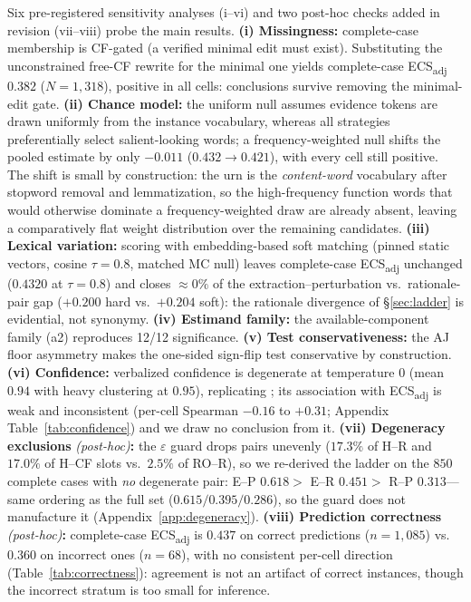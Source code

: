 \documentclass[11pt]{article}
\newcommand{\ecsadj}{\mbox{ECS\textsubscript{adj}}}
\begin{document}
Six pre-registered sensitivity analyses (i--vi) and two post-hoc checks added in revision (vii--viii) probe the main results. \textbf{(i) Missingness:} complete-case membership is CF-gated (a verified minimal edit must exist). Substituting the unconstrained free-CF rewrite for the minimal one yields complete-case \ecsadj{} $0.382$ ($N{=}1{,}318$), positive in all cells: conclusions survive removing the minimal-edit gate. \textbf{(ii) Chance model:} the uniform null assumes evidence tokens are drawn uniformly from the instance vocabulary, whereas all strategies preferentially select salient-looking words; a frequency-weighted null shifts the pooled estimate by only $-0.011$ ($0.432\to0.421$), with every cell still positive. The shift is small by construction: the urn is the \emph{content-word} vocabulary after stopword removal and lemmatization, so the high-frequency function words that would otherwise dominate a frequency-weighted draw are already absent, leaving a comparatively flat weight distribution over the remaining candidates. \textbf{(iii) Lexical variation:} scoring with embedding-based soft matching (pinned static vectors, cosine $\tau{=}0.8$, matched MC null) leaves complete-case \ecsadj{} unchanged ($0.4320$ at $\tau{=}0.8$) and closes $\approx 0\%$ of the extraction--perturbation vs.\ rationale-pair gap ($+0.200$ hard vs.\ $+0.204$ soft): the rationale divergence of \S\ref{sec:ladder} is evidential, not synonymy. \textbf{(iv) Estimand family:} the available-component family (a2) reproduces 12/12 significance. \textbf{(v) Test conservativeness:} the AJ floor asymmetry makes the one-sided sign-flip test conservative by construction. \textbf{(vi) Confidence:} verbalized confidence is degenerate at temperature 0 (mean $0.94$ with heavy clustering at $0.95$), replicating \citet{xiong2024can}; its association with \ecsadj{} is weak and inconsistent (per-cell Spearman $-0.16$ to $+0.31$; Appendix Table~\ref{tab:confidence}) and we draw no conclusion from it. \textbf{(vii) Degeneracy exclusions} \emph{(post-hoc)}\textbf{:} the $\varepsilon$ guard drops pairs unevenly ($17.3\%$ of H--R and $17.0\%$ of H--CF slots vs.\ $2.5\%$ of RO--R), so we re-derived the ladder on the $850$ complete cases with \emph{no} degenerate pair: E--P $0.618 >$ E--R $0.451 >$ R--P $0.313$---same ordering as the full set ($0.615/0.395/0.286$), so the guard does not manufacture it (Appendix~\ref{app:degeneracy}). \textbf{(viii) Prediction correctness} \emph{(post-hoc)}\textbf{:} complete-case \ecsadj{} is $0.437$ on correct predictions ($n{=}1{,}085$) vs.\ $0.360$ on incorrect ones ($n{=}68$), with no consistent per-cell direction (Table~\ref{tab:correctness}): agreement is not an artifact of correct instances, though the incorrect stratum is too small for inference.
\end{document}
